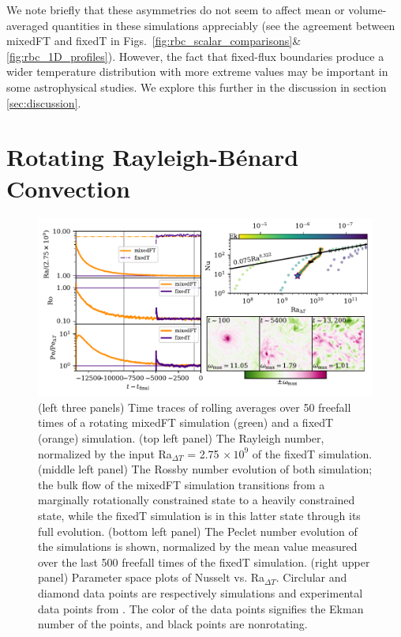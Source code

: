 \documentclass[aps, pre, onecolumn, nofootinbib, notitlepage, groupedaddress, amsfonts, amssymb, amsmath, longbibliography, superscriptaddress]{revtex4-1}
\newcommand{\RB}{Rayleigh-B\'{e}nard }
\begin{document}
We note briefly that these asymmetries do not seem to affect mean or volume-averaged quantities in these simulations appreciably (see the agreement between mixedFT and fixedT in Figs.~\ref{fig:rbc_scalar_comparisons}\&\ref{fig:rbc_1D_profiles}).
However, the fact that fixed-flux boundaries produce a wider temperature distribution with more extreme values may be important in some astrophysical studies.
We explore this further in the discussion in section \ref{sec:discussion}.





\section{Rotating \RB Convection}
\label{sec:rotating_results}
\begin{figure}
\includegraphics[width=\textwidth]{./figs/rotating_panels.pdf}
\caption{ 
	(left three panels) Time traces of rolling averages over 50 freefall times of a rotating mixedFT simulation (green) and a fixedT (orange) simulation.
	(top left panel) The Rayleigh number, normalized by the input Ra$_{\Delta T}$ = 2.75$\,\times 10^9$ of the fixedT simulation.
	(middle left panel) The Rossby number evolution of both simulation; the bulk flow of the mixedFT simulation transitions from a marginally rotationally constrained state to a heavily constrained state, while the fixedT simulation is in this latter state through its full evolution.
	(bottom left panel) The Peclet number evolution of the simulations is shown, normalized by the mean value measured over the last 500 freefall times of the fixedT simulation.
	(right upper panel) Parameter space plots of Nusselt vs. Ra$_{\Delta T}$.
	Circlular and diamond data points are respectively simulations and experimental data points from \cite{cheng&all2015}.
	The color of the data points signifies the Ekman number of the points, and black points are nonrotating.
}
\end{figure}
\end{document}
